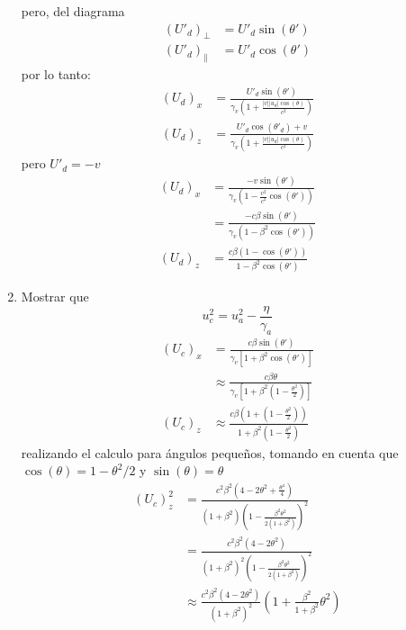 \documentclass[12pt,letterpaper]{report}
\begin{document}
\begin{enumerate}
    pero, del diagrama
    \begin{align*}
        ({U}'_d)_\perp &= {U}'_d \sin({\theta}')\\
        ({U}'_d)_\parallel&={U}'_d \cos({\theta}')
    \end{align*}
    por lo tanto:
    \begin{align*}
        (U_d)_x &= \frac{{U}'_d \sin({\theta}')}{\gamma_v \left(1+\frac{|v||u_d|\cos(\theta)}{c^2} \right)}\\
        (U_d)_z &= \frac{{U}'_d \cos({\theta}'_d)+v}{\gamma_v \left(1+\frac{|v||u_d|\cos(\theta)}{c^2} \right)}
    \end{align*}
    pero ${U}'_d =-v$
    \begin{align*}
        (U_d)_x &= \frac{-v \sin({\theta}')}{\gamma_v \left(1- \frac{v^2}{c^2}\cos({\theta}') \right)}\\
        & = \frac{-c\beta \sin({\theta}')}{\gamma_v (1-\beta^2 \cos({\theta}'))}\\
        (U_d)_z &= \frac{c\beta (1-\cos({\theta}'))}{1-\beta^2 \cos({\theta}')}
    \end{align*}
    \item Mostrar que
    \begin{equation}
        u_c^2 = u_a^2 - \frac{\eta}{\gamma_a}
    \end{equation}
    \begin{align*}
        (U_c)_x &= \frac{c\beta \sin({\theta}')}{\gamma_v \left[1+\beta^2 \cos({\theta}') \right]}\\
        & \approx \frac{c \beta  \theta}{\gamma_v \left[1+\beta^2 \left(1- \frac{\theta^2}{2} \right) \right]}\\
        (U_c)_z & \approx \frac{c \beta (1+\left(1-\frac{\theta^2}{2} \right))}{1+\beta^2\left(1-\frac{\theta^2}{2}\right)}
    \end{align*}
    realizando el calculo para ángulos pequeños, tomando en cuenta que $\cos(\theta)=1-\theta^2/2$ y $\sin(\theta)=\theta$
    \begin{align*}
        (U_c)_z^2 &= \frac{c^2 \beta^2 \left(4-2\theta^2+\frac{\theta^4}{4}\right)}{(1+\beta^2)\left(1- \frac{\beta^2 \theta^2}{2(1+\beta^2)}\right)^2}\\
        & = \frac{c^2 \beta^2 (4-2\theta^2)}{(1+\beta^2)^2 \left(1- \frac{\beta^2 \theta^2 }{2(1+\beta^2)}\right)^2}\\
        & \approx \frac{c^2 \beta^2 (4-2\theta^2)}{(1+\beta^2)^2} \left(1+ \frac{\beta^2}{1+\beta^2}\theta^2 \right)\\

\end{align*}
\end{enumerate}
\end{document}
